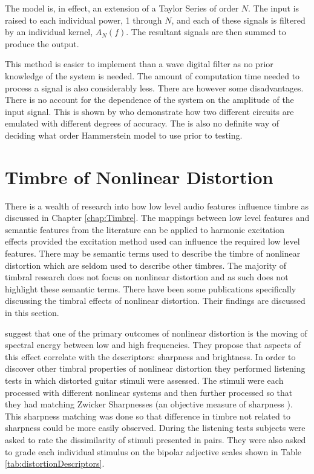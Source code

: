 			The model is, in effect, an extension of a Taylor Series of order $N$. The input is raised to each
			individual power, 1 through $N$, and each of these signals is filtered by an individual kernel,
			$A_{N}(f)$. The resultant signals are then summed to produce the output.

			This method is easier to implement than a wave digital filter as no prior knowledge of the system
			is needed. The amount of computation time needed to process a signal is also considerably less.
			There are however some disadvantages. There is no account for the dependence of the system on the
			amplitude of the input signal. This is shown by \citet{novak2010analysis} who demonstrate how two
			different circuits are emulated with different degrees of accuracy. The is also no definite way of
			deciding what order Hammerstein model to use prior to testing.

\section{Timbre of Nonlinear Distortion}
\label{sec:Excitation-Timbre}
	There is a wealth of research into how low level audio features influence timbre as discussed in Chapter
	\ref{chap:Timbre}. The mappings between low level features and semantic features from the literature can be applied
	to harmonic excitation effects provided the excitation method used can influence the required low level features.
	There may be semantic terms used to describe the timbre of nonlinear distortion which are seldom used to describe
	other timbres. The majority of timbral research does not focus on nonlinear distortion and as such does not
	highlight these semantic terms. There have been some publications specifically discussing the timbral effects of
	nonlinear distortion. Their findings are discussed in this section.

	\citet{marui2005predicting} suggest that one of the primary outcomes of nonlinear distortion is the moving of
	spectral energy between low and high frequencies. They propose that aspects of this effect correlate with the
	descriptors: sharpness and brightness. In order to discover other timbral properties of nonlinear distortion they
	performed listening tests in which distorted guitar stimuli were assessed. The stimuli were each processed with
	different nonlinear systems and then further processed so that they had matching Zwicker Sharpnesses (an objective
	measure of sharpness \cite{fastl2007psychoacoustics}). This sharpness matching was done so that difference in
	timbre not related to sharpness could be more easily observed. During the listening tests subjects were asked to
	rate the dissimilarity of stimuli presented in pairs. They were also asked to grade each individual stimulus on the
	bipolar adjective scales shown in Table \ref{tab:distortionDescriptors}.

